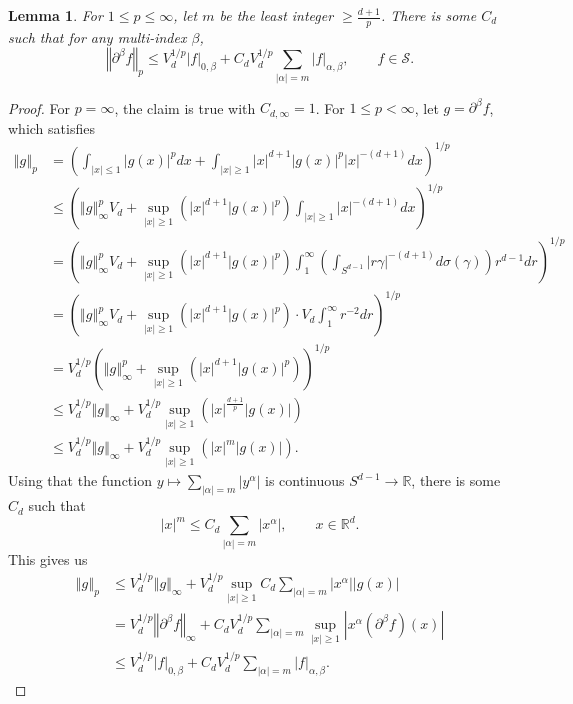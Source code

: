 \documentclass{article}
\newcommand{\norm}[1]{\left\Vert #1 \right\Vert}
\newtheorem{lemma}[theorem]{Lemma}
\theoremstyle{definition}
\begin{document}
\begin{lemma}
For $1 \leq p \leq \infty$, let
$m$ be the least integer $\geq \frac{d+1}{p}$.
There is some $C_d$ such that for any multi-index $\beta$,
\[
\norm{\partial^\beta f}_p \leq V_d^{1/p} |f|_{0,\beta} + C_d V_d^{1/p} \sum_{|\alpha|=m} |f|_{\alpha,\beta}, \qquad
f \in \mathscr{S}.
\]
\label{schwartzLp}
\end{lemma}
\begin{proof}
For $p=\infty$, the claim is true with $C_{d,\infty}=1$. 
For $1 \leq p < \infty$, let 
$g = \partial^\beta f$, which satisfies
\begin{align*}
\norm{g}_p&=\left( \int_{|x| \leq 1} |g(x)|^p dx + \int_{|x| \geq 1} |x|^{d+1} |g(x)|^p |x|^{-(d+1)} dx \right)^{1/p}\\
&\leq \left( \norm{g}_\infty^p V_d + \sup_{|x| \geq 1} \left( |x|^{d+1}|g(x)|^p \right) \int_{|x| \geq 1}
|x|^{-(d+1)} dx \right)^{1/p}\\
&=\left( \norm{g}_\infty^p V_d + \sup_{|x| \geq 1} \left( |x|^{d+1}|g(x)|^p \right) \int_1^\infty\left( \int_{S^{d-1}} |r\gamma|^{-(d+1)}
d\sigma(\gamma) \right) r^{d-1} dr \right)^{1/p}\\
&=\left( \norm{g}_\infty^p V_d + \sup_{|x| \geq 1} \left( |x|^{d+1}|g(x)|^p \right) \cdot V_d \int_1^\infty r^{-2} dr \right)^{1/p}\\
&=V_d^{1/p} \left( \norm{g}_\infty^p + \sup_{|x| \geq 1}  \left( |x|^{d+1}|g(x)|^p \right) \right)^{1/p}\\
&\leq V_d^{1/p} \norm{g}_\infty + V_d^{1/p}  \sup_{|x| \geq 1}  \left( |x|^{\frac{d+1}{p}}|g(x)| \right)\\
&\leq V_d^{1/p} \norm{g}_\infty + V_d^{1/p} \sup_{|x| \geq 1} \left( |x|^m |g(x)| \right).
\end{align*}
Using that the function $y \mapsto \sum_{|\alpha|=m} |y^\alpha|$ is continuous $S^{d-1} \to \mathbb{R}$,
there is some $C_d$ such that
\[
|x|^m \leq C_d \sum_{|\alpha|=m} |x^\alpha|, \qquad x \in \mathbb{R}^d.
\]
This gives us
\begin{align*}
\norm{g}_p& \leq V_d^{1/p} \norm{g}_\infty + V_d^{1/p} \sup_{|x| \geq 1} C_d  \sum_{|\alpha|=m} |x^\alpha| |g(x)|\\
&= V_d^{1/p} \norm{\partial^\beta f}_\infty  + C_d V_d^{1/p} \sum_{|\alpha|=m} \sup_{|x| \geq 1} |x^\alpha (\partial^\beta f)(x)|\\
&\leq V_d^{1/p} |f|_{0,\beta} + C_d V_d^{1/p} \sum_{|\alpha|=m} |f|_{\alpha,\beta}.
\end{align*}
\end{proof}
\end{document}
